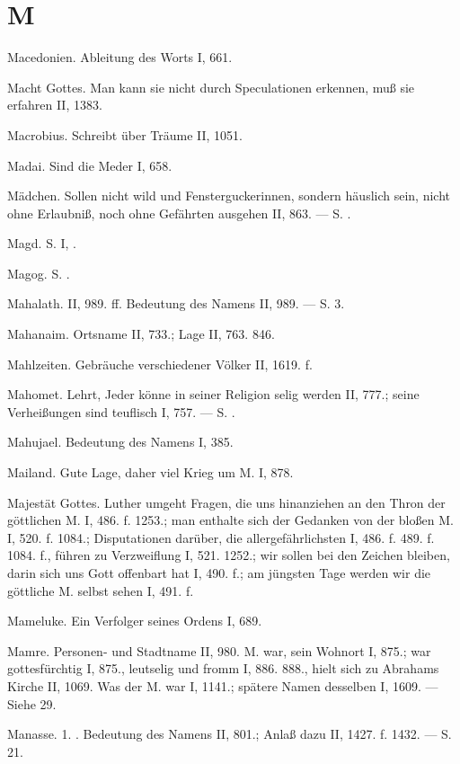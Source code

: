 \section{M}

Macedonien. Ableitung des Worts I, 661.

Macht Gottes. Man kann sie nicht durch Speculationen erkennen, muß sie erfahren II, 1383.

Macrobius. Schreibt über Träume II, 1051.

Madai. Sind die Meder I, 658.

Mädchen. Sollen nicht wild und Fensterguckerinnen, sondern häuslich sein, nicht ohne Erlaubniß, noch ohne Gefährten ausgehen II, 863. — S. .

Magd. S.  I, .

Magog. S. .

Mahalath. II, 989. ff. Bedeutung des Namens II, 989. — S.  3.

Mahanaim. Ortsname II, 733.; Lage II, 763. 846.

Mahlzeiten. Gebräuche verschiedener Völker II, 1619. f.

Mahomet. Lehrt, Jeder könne in seiner Religion selig werden II, 777.; seine Verheißungen sind teuflisch I, 757. — S. .

Mahujael. Bedeutung des Namens I, 385.

Mailand. Gute Lage, daher viel Krieg um M. I, 878.

Majestät Gottes. Luther umgeht Fragen, die uns hinanziehen an den Thron der göttlichen M. I, 486. f. 1253.; man enthalte sich der Gedanken von der bloßen M. I, 520. f. 1084.; Disputationen darüber, die allergefährlichsten I, 486. f. 489. f. 1084. f., führen zu Verzweiflung I, 521. 1252.; wir sollen bei den Zeichen bleiben, darin sich uns Gott offenbart hat I, 490. f.; am jüngsten Tage werden wir die göttliche M. selbst sehen I, 491. f.

Mameluke. Ein Verfolger seines Ordens I, 689.

Mamre. Personen- und Stadtname II, 980.  M. war, sein Wohnort I, 875.; war gottesfürchtig I, 875., leutselig und fromm I, 886. 888., hielt sich zu Abrahams Kirche II, 1069. Was der  M. war I, 1141.; spätere Namen desselben I, 1609. — Siehe  29.

Manasse. 1. . Bedeutung des Namens II, 801.; Anlaß dazu II, 1427. f. 1432. — S.  21.

